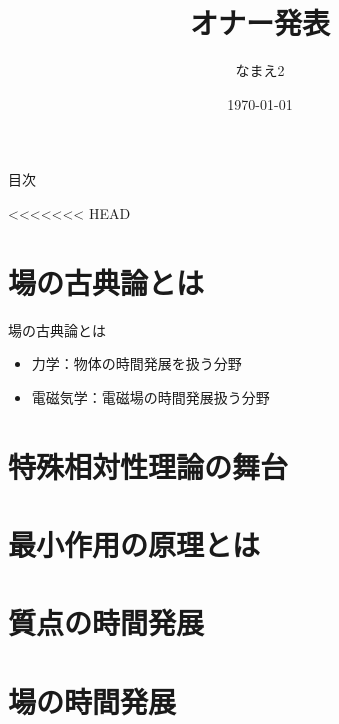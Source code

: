 \documentclass[unicode, lualatex, aspectratio=169, 10.5pt]{beamer}
\title[オナー発表]{オナー発表} %
\author[なまえ1]{なまえ2}     %
\institute[A]{B}              %
\date{\today}                 %
\begin{document}
\begin{frame}
  \titlepage
\end{frame}

\begin{frame}{目次}
  \tableofcontents
\end{frame}

<<<<<<< HEAD
\section{場の古典論とは}

\begin{frame}{場の古典論とは}
  \begin{itemize}
    \item 力学：物体の時間発展を扱う分野
    \item 電磁気学：電磁場の時間発展扱う分野
  \end{itemize}
\end{frame}

\section{特殊相対性理論の舞台}

\section{最小作用の原理とは}

\section{質点の時間発展}

\section{場の時間発展}
\end{document}
